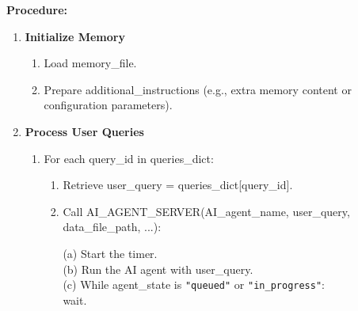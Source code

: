 \documentclass[final,3p,times]{elsarticle}
\begin{document}
\begin{algorithm}[t]
\caption{TEST\_BEMS\_AI\_AGENT}
\label{alg:agent_test}


\BlankLine
\textbf{Procedure:}

\begin{enumerate}
  \item \textbf{Initialize Memory}
    \begin{enumerate}
      \item Load memory\_file.
      \item Prepare additional\_instructions (e.g., extra memory content or configuration parameters).
    \end{enumerate}

  \item \textbf{Process User Queries}
    \begin{enumerate}
      \item For each query\_id in queries\_dict:
        \begin{enumerate}
          \item Retrieve user\_query = queries\_dict[query\_id].
          \item Call AI\_AGENT\_SERVER(AI\_agent\_name, user\_query, data\_file\_path, ...):
          
            \Indp
                (a) Start the timer. \\
                (b) Run the AI agent with user\_query. \\
                (c) While agent\_state is \texttt{"queued"} or \texttt{"in\_progress"}: \\
                \Indp 
                    wait.\\
                \Indm
                

\end{enumerate}
\end{enumerate}
\end{enumerate}
\end{algorithm}
\end{document}
